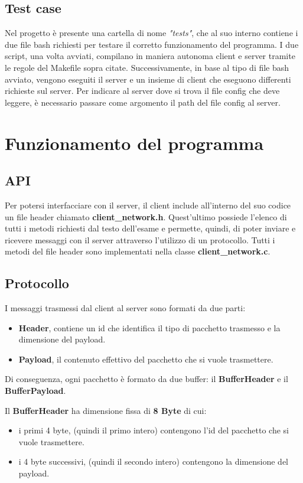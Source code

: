 \documentclass{article}
\begin{document}
\subsection{Test case}
Nel progetto è presente una cartella di nome \textit{"tests"}, che al suo interno contiene i due file bash richiesti per testare il corretto
funzionamento del programma. I due script, una volta avviati, compilano in maniera autonoma client e server tramite le regole del Makefile sopra citate. Successivamente,
in base al tipo di file bash avviato, vengono eseguiti il server e un insieme di client che eseguono differenti richieste sul server. 
Per indicare al server dove si trova il file config che deve leggere, è necessario passare come argomento il path del file config al server.

\section{Funzionamento del programma}

\subsection{API}
Per potersi interfacciare con il server, il client include all'interno del suo codice un file header chiamato \textbf{client\_network.h}. Quest'ultimo possiede l'elenco di tutti i metodi
richiesti dal testo dell'esame e permette, quindi, di poter inviare e ricevere messaggi con il server attraverso l'utilizzo di un protocollo. Tutti i metodi del file header sono 
implementati nella classe \textbf{client\_network.c}.

\subsection{Protocollo}
I messaggi trasmessi dal client al server sono formati da due parti:
\begin{itemize}
    \itemsep 0em 
    \item \textbf{Header}, contiene un id che identifica il tipo di pacchetto trasmesso e la dimensione del payload.
    \item \textbf{Payload}, il contenuto effettivo del pacchetto che si vuole trasmettere.
\end{itemize}

Di conseguenza, ogni pacchetto è formato da due buffer: il \textbf{BufferHeader} e il \textbf{BufferPayload}.
\medskip 

Il \textbf{BufferHeader} ha dimensione fissa di \textbf{8 Byte} di cui:
\begin{itemize}
    \itemsep 0em 
    \item i primi 4 byte, (quindi il primo intero) contengono l'id del pacchetto che si vuole trasmettere.
    \item i 4 byte successivi, (quindi il secondo intero) contengono la dimensione del payload.
\end{itemize}
\end{document}
